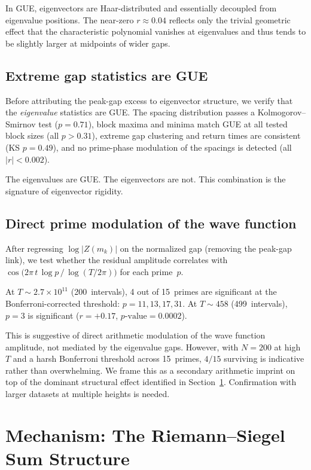 \documentclass[11pt,a4paper]{article}
\begin{document}
In GUE, eigenvectors are Haar-distributed and essentially decoupled from eigenvalue positions.
The near-zero $r \approx 0.04$ reflects only the trivial geometric effect that the characteristic polynomial vanishes at eigenvalues and thus tends to be slightly larger at midpoints of wider gaps.

\subsection{Extreme gap statistics are GUE}

Before attributing the peak-gap excess to eigenvector structure, we verify that the \emph{eigenvalue} statistics are GUE\@.
The spacing distribution passes a Kolmogorov--Smirnov test ($p = 0.71$), block maxima and minima match GUE at all tested block sizes (all $p > 0.31$), extreme gap clustering and return times are consistent (KS $p = 0.49$), and no prime-phase modulation of the spacings is detected (all $|r| < 0.002$).

The eigenvalues are GUE\@.
The eigenvectors are not.
This combination is the signature of eigenvector rigidity.

\subsection{Direct prime modulation of the wave function}

After regressing $\log|Z(m_k)|$ on the normalized gap (removing the peak-gap link), we test whether the residual amplitude correlates with $\cos\!\bigl(2\pi\, t\, \log p\,/\,\log(T/2\pi)\bigr)$ for each prime~$p$.

At $T \sim 2.7\times10^{11}$ (200~intervals), 4 out of 15~primes are significant at the Bonferroni-corrected threshold: $p = 11, 13, 17, 31$.
At $T \sim 458$ (499~intervals), $p = 3$ is significant ($r = +0.17$, $p\text{-value} = 0.0002$).

This is suggestive of direct arithmetic modulation of the wave function amplitude, not mediated by the eigenvalue gaps.
However, with $N = 200$ at high~$T$ and a harsh Bonferroni threshold across 15~primes, $4/15$ surviving is indicative rather than overwhelming.
We frame this as a secondary arithmetic imprint on top of the dominant structural effect identified in Section~\ref{sec:mechanism}.
Confirmation with larger datasets at multiple heights is needed.

\section{Mechanism: The Riemann--Siegel Sum Structure}\label{sec:mechanism}
\end{document}
